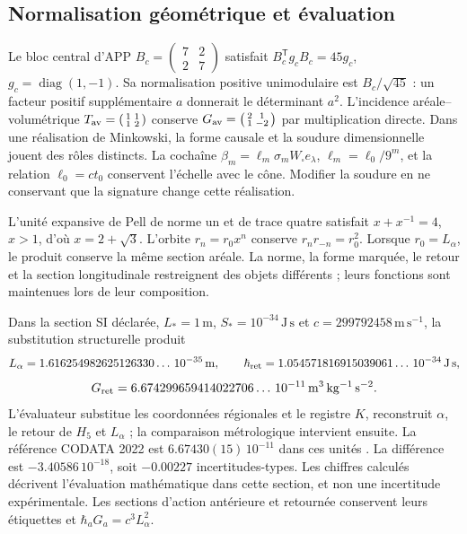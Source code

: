 \subsection{Normalisation géométrique et évaluation}
\label{md:rigidez:evaluacion}

Le bloc central d'APP
$B_c=\left(\begin{smallmatrix}7&2\\2&7\end{smallmatrix}\right)$
satisfait $B_c^{\mathsf T}g_cB_c=45g_c$, $g_c=\operatorname{diag}(1,-1)$. Sa normalisation positive unimodulaire est $B_c/\sqrt{45}$ : un facteur positif supplémentaire $a$ donnerait le déterminant $a^2$. L'incidence aréale--volumétrique
$T_{\rm av}=\left(\begin{smallmatrix}1&1\\1&2\end{smallmatrix}\right)$
conserve
$G_{\rm av}=\left(\begin{smallmatrix}2&1\\1&-2\end{smallmatrix}\right)$
par multiplication directe. Dans une réalisation de Minkowski, la forme causale et la soudure dimensionnelle jouent des rôles distincts. La cochaîne $\beta_m=\ell_m\sigma_mW_\square e_\lambda$, $\ell_m=\ell_0/9^m$, et la relation $\ell_0=ct_0$ conservent l'échelle avec le cône. Modifier la soudure en ne conservant que la signature change cette réalisation.

L'unité expansive de Pell de norme un et de trace quatre satisfait $x+x^{-1}=4$, $x>1$, d'où $x=2+\sqrt3$. L'orbite $r_n=r_0x^n$ conserve $r_nr_{-n}=r_0^2$. Lorsque $r_0=L_\alpha$, le produit conserve la même section aréale. La norme, la forme marquée, le retour et la section longitudinale restreignent des objets différents ; leurs fonctions sont maintenues lors de leur composition.

Dans la section SI déclarée, $L_*=1\,\mathrm m$, $S_*=10^{-34}\,\mathrm{J\,s}$ et $c=299792458\,\mathrm{m\,s^{-1}}$, la substitution structurelle produit
\[
 L_\alpha=1.616254982625126330\ldots\,10^{-35}\,\mathrm m,\qquad
 \hbar_{\rm ret}=1.054571816915039061\ldots\,10^{-34}\,\mathrm{J\,s},
\]
\begin{equation}
 G_{\rm ret}=6.674299659414022706\ldots\,10^{-11}
 \,\mathrm{m^3\,kg^{-1}\,s^{-2}}.
 \label{md:rigidez:valor}
\end{equation}
L'évaluateur substitue les coordonnées régionales et le registre $K$, reconstruit $\alpha$, le retour de $H_5$ et $L_\alpha$ ; la comparaison métrologique intervient ensuite. La référence CODATA 2022 est $6.67430(15)\,10^{-11}$ dans ces unités \cite{codata2022}. La différence est $-3.40586\,10^{-18}$, soit $-0.00227$ incertitudes-types. Les chiffres calculés décrivent l'évaluation mathématique dans cette section, et non une incertitude expérimentale. Les sections d'action antérieure et retournée conservent leurs étiquettes et $\hbar_aG_a=c^3L_\alpha^2$.

